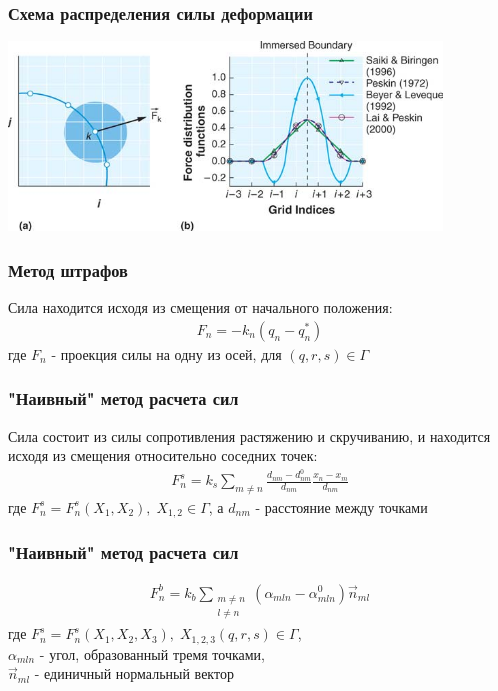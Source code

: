 \documentclass[14pt]{beamer}
\begin{document}
\begin{frame}
\frametitle{Схема распределения силы деформации}
    \begin{center}
        \includegraphics[width=11.5cm]{delta_function.png}
    \end{center}
\end{frame}

\begin{frame}
\frametitle{Метод штрафов}
Сила находится исходя из смещения от начального положения:
\begin{gather}
    \label{eq:penalty_method}
    F_n = -k_n (q_n - q^{*}_n)
\end{gather}
где $F_n$ - проекция силы на одну из осей, для $(q, r, s) \in \Gamma$
\end{frame}

\begin{frame}
\frametitle{"Наивный" метод расчета сил}
Сила состоит из силы сопротивления растяжению и скручиванию, и находится исходя из смещения относительно соседних точек:
\begin{gather}
    \label{eq:naive_extension}
    F^s_n =  k_s \sum_{m \ne n} \frac{d_{nm} - d^0_{nm}}{d_{nm}} \frac{x_n - x_m}{d_{nm}}
\end{gather}
где $F^s_n = F^s_n(X_1, X_2),\;X_{1,2} \in \Gamma$, а $d_{nm}$ - расстояние между точками
\end{frame}

\begin{frame}
\frametitle{"Наивный" метод расчета сил}
\begin{gather}
    \label{eq:naive_extension}
    F^b_n =  k_b \sum_{\substack{m \ne n\\l \ne n}} (\alpha_{mln} - \alpha^0_{mln}) \vec{n}_{ml}
\end{gather}
где $F^s_n = F^s_n(X_1, X_2, X_3),\;X_{1,2,3}(q, r, s) \in \Gamma$, \\
$\alpha_{mln}$ - угол, образованный тремя точками, \\
$\vec{n}_{ml}$ - единичный нормальный вектор
\end{frame}
\end{document}
